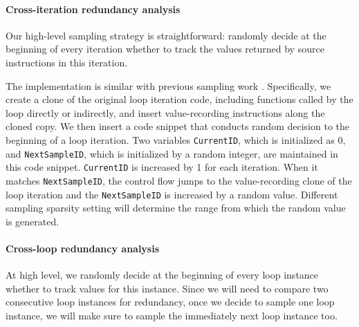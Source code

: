 
\paragraph{Cross-iteration redundancy analysis}
Our high-level sampling strategy is straightforward:
randomly decide at the
beginning of every iteration whether to track the values returned by
source instructions in this iteration.

The implementation is similar with previous sampling work 
\cite{liblit03,liblit05}.
Specifically, we create a clone of the original
loop iteration code, including functions called by the loop directly or
indirectly, and insert value-recording instructions along the
cloned copy. 
We then insert a code snippet that conducts random decision to
the beginning of a loop iteration. 
Two variables \texttt{CurrentID}, which is initialized as 0, 
and \texttt{NextSampleID}, which is initialized by a random integer, 
are maintained
in this code snippet. \texttt{CurrentID} is increased by 1
for each iteration. When it matches \texttt{NextSampleID}, the control
flow jumps to the value-recording clone of the loop iteration and the 
\texttt{NextSampleID} is increased by a random value. Different sampling
sparsity setting will determine the range from which the random value is
generated.


\paragraph{Cross-loop redundancy analysis} 
At high level, we randomly decide at the beginning
of every loop instance whether to track values for this instance. 
Since we will need to compare two consecutive loop
instances for redundancy, once we decide to sample one loop instance, we will
make sure to sample the immediately next loop instance too.

